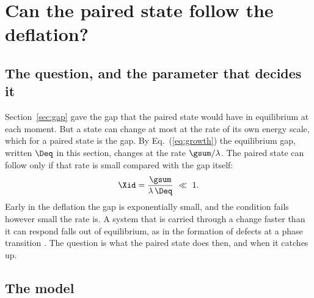 \section{Can the paired state follow the deflation?}
\label{sec:quench}

\subsection{The question, and the parameter that decides it}

Section~\ref{sec:gap} gave the gap that the paired state would have in equilibrium at each moment.
But a state can change at most at the rate of its own energy scale, which for a paired state is the
gap. By Eq.~(\ref{eq:growth}) the equilibrium gap, written $\Deq$ in this section, changes at the
rate $\gsum/\lambda$. The paired state can follow only if that rate is small compared with the gap
itself:
\begin{equation}
\Xid=\frac{\gsum}{\lambda\,\Deq}\ \ll\ 1 .
\label{eq:Xi}
\end{equation}
Early in the deflation the gap is exponentially small, and the condition fails however small the
rate is. A system that is carried through a change faster than it can respond falls out of
equilibrium, as in the formation of defects at a phase transition \cite{Kibble1976,Zurek1985}. The
question is what the paired state does then, and when it catches up.

\subsection{The model}

